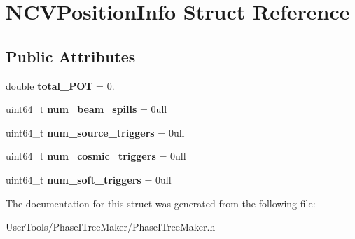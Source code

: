 \hypertarget{structNCVPositionInfo}{
\section{NCVPositionInfo Struct Reference}
\label{structNCVPositionInfo}
}
\subsection*{Public Attributes}
\begin{DoxyCompactItemize}
\item 
\hypertarget{structNCVPositionInfo_ace4afc2346cc29522e1732f9f41de8dd}{
double {\bfseries total\_\-POT} = 0.}
\label{structNCVPositionInfo_ace4afc2346cc29522e1732f9f41de8dd}

\item 
\hypertarget{structNCVPositionInfo_a813f7edef83ad94a009257ece03392dd}{
uint64\_\-t {\bfseries num\_\-beam\_\-spills} = 0ull}
\label{structNCVPositionInfo_a813f7edef83ad94a009257ece03392dd}

\item 
\hypertarget{structNCVPositionInfo_aa9303f33637e7e3f3a47dbc1ec915e97}{
uint64\_\-t {\bfseries num\_\-source\_\-triggers} = 0ull}
\label{structNCVPositionInfo_aa9303f33637e7e3f3a47dbc1ec915e97}

\item 
\hypertarget{structNCVPositionInfo_a5e5afcbdc00981d16728e325c0a8eca9}{
uint64\_\-t {\bfseries num\_\-cosmic\_\-triggers} = 0ull}
\label{structNCVPositionInfo_a5e5afcbdc00981d16728e325c0a8eca9}

\item 
\hypertarget{structNCVPositionInfo_ac4c3befd94418e04f02d2549569bd5eb}{
uint64\_\-t {\bfseries num\_\-soft\_\-triggers} = 0ull}
\label{structNCVPositionInfo_ac4c3befd94418e04f02d2549569bd5eb}

\end{DoxyCompactItemize}


The documentation for this struct was generated from the following file:\begin{DoxyCompactItemize}
\item 
UserTools/PhaseITreeMaker/PhaseITreeMaker.h\end{DoxyCompactItemize}
